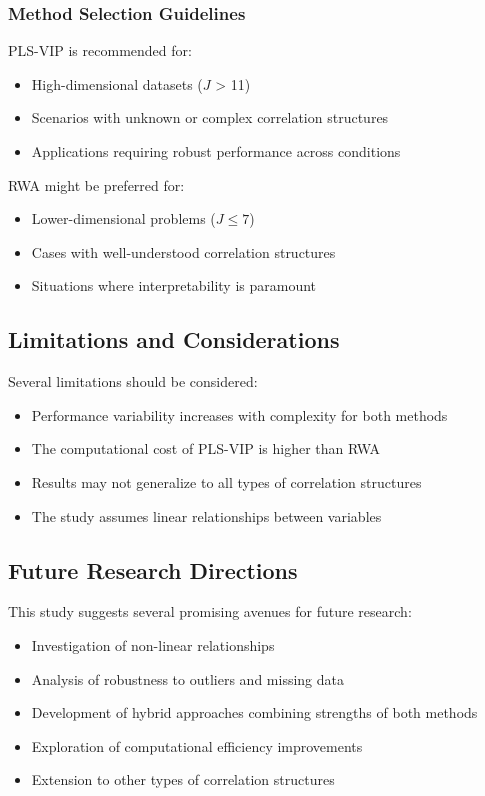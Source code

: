\subsubsection{Method Selection Guidelines}
PLS-VIP is recommended for:
\begin{itemize}
    \item High-dimensional datasets ($J$ > 11)
    \item Scenarios with unknown or complex correlation structures
    \item Applications requiring robust performance across conditions
\end{itemize}

RWA might be preferred for:
\begin{itemize}
    \item Lower-dimensional problems ($J \leq 7$)
    \item Cases with well-understood correlation structures
    \item Situations where interpretability is paramount
\end{itemize}

\subsection{Limitations and Considerations}
Several limitations should be considered:
\begin{itemize}
    \item Performance variability increases with complexity for both methods
    \item The computational cost of PLS-VIP is higher than RWA
    \item Results may not generalize to all types of correlation structures
    \item The study assumes linear relationships between variables
\end{itemize}

\subsection{Future Research Directions}
This study suggests several promising avenues for future research:
\begin{itemize}
    \item Investigation of non-linear relationships
    \item Analysis of robustness to outliers and missing data
    \item Development of hybrid approaches combining strengths of both methods
    \item Exploration of computational efficiency improvements
    \item Extension to other types of correlation structures
\end{itemize} 